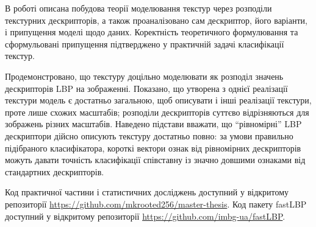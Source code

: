В роботі описана побудова теорії моделювання текстур через розподіли текстурних дескрипторів,
а також проаналізовано сам дескриптор, його варіанти, і припущення моделі щодо даних.
Коректність теоретичного формулювання та сформульовані припущення підтверджено 
у практичній задачі класифікації текстур.

Продемонстровано, що текстуру доцільно моделювати як розподіл значень дескрипторів LBP на зображенні.
Показано, що утворена з однієї реалізації текстури модель є достатньо загальною, 
щоб описувати і інші реалізації текстури, проте лише схожих масштабів; 
розподіли дескрипторів суттєво відрізняються для зображень різних масштабів.
Наведено підстави вважати, що ``рівномірні'' LBP дескриптори дійсно описують текстуру достатньо повно: 
за умови правильно підібраного класифікатора, короткі вектори ознак від рівномірних дескрипторів можуть 
давати точність класифікації співставну із значно довшими ознаками від стандартних дескрипторів. 

Код практичної частини і статистичних досліджень доступний у відкритому репозиторії \url{https://github.com/mkrooted256/master-thesis}.
Код пакету fastLBP доступний у відкритому репозиторії \url{https://github.com/imbg-ua/fastLBP}.
